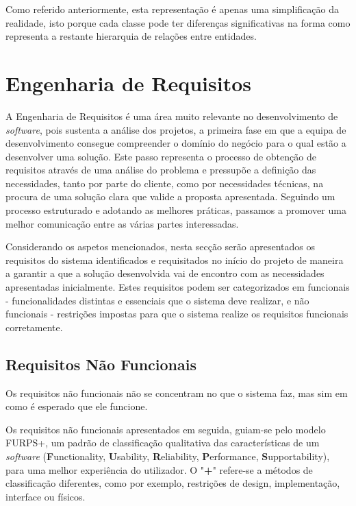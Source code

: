Como referido anteriormente, esta representação é apenas uma simplificação da realidade, isto
porque cada classe pode ter diferenças significativas na forma como representa a restante
hierarquia de relações entre entidades.

\section{Engenharia de Requisitos}

A Engenharia de Requisitos é uma área muito relevante no desenvolvimento de \textit{software}, pois 
sustenta a análise dos projetos, a primeira fase em que a equipa de desenvolvimento consegue 
compreender o domínio do negócio para o qual estão a desenvolver uma solução. Este passo representa 
o processo de obtenção de requisitos através de uma análise do problema e pressupõe a definição 
das necessidades, tanto por parte do cliente, como por necessidades técnicas, na procura de uma 
solução clara que valide a proposta apresentada. Seguindo um processo estruturado e adotando as 
melhores práticas, passamos a promover uma melhor comunicação entre as várias partes interessadas.

Considerando os aspetos mencionados, nesta secção serão apresentados os requisitos do sistema 
identificados e requisitados no início do projeto de maneira a garantir a que a solução desenvolvida 
vai de encontro com as necessidades apresentadas inicialmente. Estes requisitos podem ser 
categorizados em funcionais - funcionalidades distintas e essenciais que o sistema deve realizar, 
e não funcionais - restrições impostas para que o sistema realize os requisitos funcionais 
corretamente.

\subsection{Requisitos Não Funcionais}

Os requisitos não funcionais não se concentram no que o sistema faz, mas sim em como é esperado que
ele funcione. 

Os requisitos não funcionais apresentados em seguida, guiam-se pelo modelo FURPS+, um padrão de 
classificação qualitativa das características de um \textit{software} (\textbf{F}unctionality, 
\textbf{U}sability, \textbf{R}eliability, \textbf{P}erformance, \textbf{S}upportability), para uma 
melhor experiência do utilizador. O "\textbf{+}" refere-se a métodos de classificação diferentes, 
como por exemplo, restrições de design, implementação, interface ou físicos.

